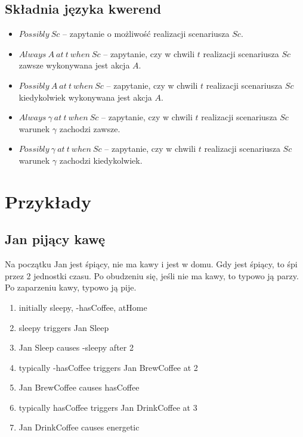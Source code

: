 \documentclass{article}
\begin{document}
\subsection{Składnia języka kwerend}
\begin{itemize}
    \item $Possibly\ Sc$ – zapytanie o możliwość realizacji scenariusza $Sc$.
    \item $Always\ A\ at\ t\ when\ Sc$ – zapytanie, czy w chwili $t$ realizacji scenariusza $Sc$ zawsze wykonywana jest akcja $A$.
    \item $Possibly\ A\ at\ t\ when\ Sc$ – zapytanie, czy w chwili $t$ realizacji scenariusza $Sc$ kiedykolwiek wykonywana jest akcja $A$.
    \item $Always\ \gamma\ at\ t\ when\ Sc$ – zapytanie, czy w chwili $t$ realizacji scenariusza $Sc$ warunek $\gamma$ zachodzi zawsze.
    \item $Possibly\ \gamma\ at\ t\ when\ Sc$ – zapytanie, czy w chwili $t$ realizacji scenariusza $Sc$ warunek $\gamma$ zachodzi kiedykolwiek.
\end{itemize}

\section{Przykłady}

\subsection{Jan pijący kawę}
Na początku Jan jest śpiący, nie ma kawy i jest w domu.
Gdy jest śpiący, to śpi przez 2 jednostki czasu.
Po obudzeniu się, jeśli nie ma kawy, to typowo ją parzy.
Po zaparzeniu kawy, typowo ją pije.

\begin{enumerate}
    \item initially sleepy, -hasCoffee, atHome
    \item sleepy triggers Jan Sleep  
    \item Jan Sleep causes -sleepy after 2  
    \item typically -hasCoffee triggers Jan BrewCoffee at 2  
    \item Jan BrewCoffee causes hasCoffee  
    \item typically hasCoffee triggers Jan DrinkCoffee at 3  
    \item Jan DrinkCoffee causes energetic  
\end{enumerate}
\end{document}
